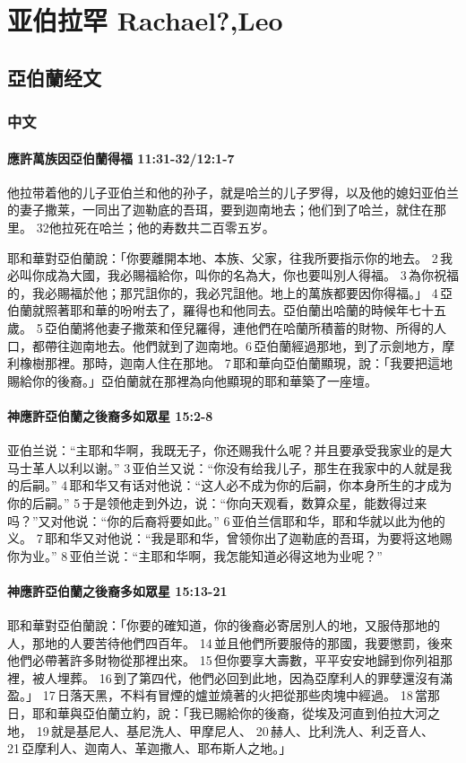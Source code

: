 \chapter{亚伯拉罕 Rachael?,Leo}
\section{亞伯蘭经文}
\subsection{中文}
\subsubsection{應許萬族因亞伯蘭得福 11:31-32/12:1-7}
他拉带着他的儿子亚伯兰和他的孙子，就是哈兰的儿子罗得，以及他的媳妇亚伯兰的妻子撒莱，一同出了迦勒底的吾珥，要到迦南地去；他们到了哈兰，就住在那里。 32他拉死在哈兰；他的寿数共二百零五岁。

耶和華對亞伯蘭說：「你要離開本地、本族、父家，往我所要指示你的地去。 2 我必叫你成為大國，我必賜福給你，叫你的名為大，你也要叫別人得福。 3 為你祝福的，我必賜福於他；那咒詛你的，我必咒詛他。地上的萬族都要因你得福。」 4 亞伯蘭就照著耶和華的吩咐去了，羅得也和他同去。亞伯蘭出哈蘭的時候年七十五歲。 5 亞伯蘭將他妻子撒萊和侄兒羅得，連他們在哈蘭所積蓄的財物、所得的人口，都帶往迦南地去。他們就到了迦南地。6 亞伯蘭經過那地，到了示劍地方，摩利橡樹那裡。那時，迦南人住在那地。 7 耶和華向亞伯蘭顯現，說：「我要把這地賜給你的後裔。」亞伯蘭就在那裡為向他顯現的耶和華築了一座壇。 





\subsubsection{神應許亞伯蘭之後裔多如眾星 15:2-8}
亚伯兰说：“主耶和华啊，我既无子，你还赐我什么呢？并且要承受我家业的是大马士革人以利以谢。” 3 亚伯兰又说：“你没有给我儿子，那生在我家中的人就是我的后嗣。” 4 耶和华又有话对他说：“这人必不成为你的后嗣，你本身所生的才成为你的后嗣。” 5 于是领他走到外边，说：“你向天观看，数算众星，能数得过来吗？”又对他说：“你的后裔将要如此。” 6 亚伯兰信耶和华，耶和华就以此为他的义。 7 耶和华又对他说：“我是耶和华，曾领你出了迦勒底的吾珥，为要将这地赐你为业。” 8 亚伯兰说：“主耶和华啊，我怎能知道必得这地为业呢？” 
\subsubsection{神應許亞伯蘭之後裔多如眾星 15:13-21}
耶和華對亞伯蘭說：「你要的確知道，你的後裔必寄居別人的地，又服侍那地的人，那地的人要苦待他們四百年。 14 並且他們所要服侍的那國，我要懲罰，後來他們必帶著許多財物從那裡出來。 15 但你要享大壽數，平平安安地歸到你列祖那裡，被人埋葬。 16 到了第四代，他們必回到此地，因為亞摩利人的罪孽還沒有滿盈。」 17 日落天黑，不料有冒煙的爐並燒著的火把從那些肉塊中經過。 18 當那日，耶和華與亞伯蘭立約，說：「我已賜給你的後裔，從埃及河直到伯拉大河之地， 19 就是基尼人、基尼洗人、甲摩尼人、 20 赫人、比利洗人、利乏音人、 21 亞摩利人、迦南人、革迦撒人、耶布斯人之地。」




